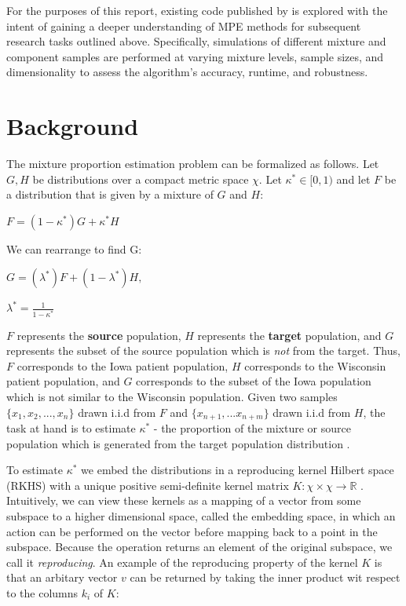 \documentclass[lineno]{biometrika}
\begin{document}
For the purposes of this report, existing code published by \citet{Ramaswamy:2016} is explored with the intent of gaining a deeper understanding of MPE methods for subsequent research tasks outlined above.  Specifically, simulations of different mixture and component samples are performed at varying mixture levels, sample sizes, and dimensionality to assess the algorithm's accuracy, runtime, and robustness.

\section{Background}
The mixture proportion estimation problem can be formalized as follows. Let $G, H$ be distributions over a compact metric space $\chi$. Let $\kappa^* \in [0,1)$ and let $F$ be a distribution that is given by a mixture of $G$ and $H$: 

\begin{center}
$F = (1-\kappa^* )G + \kappa^* H$
\end{center}

We can rearrange to find G:

\begin{center}
$G = (\lambda^*)F + (1-\lambda^*)H, $ 
\end{center}

\begin{center}
$\lambda^* = \frac{1}{1-\kappa^*}$ 
\end{center} 

$F$ represents the \textbf{source} population, $H$ represents the \textbf{target} population, and $G$ represents the subset of the source population which is \textit{not} from the target. Thus, $F$ corresponds to the Iowa patient population, $H$ corresponds to the Wisconsin patient population, and $G$ corresponds to the subset of the Iowa population which is not similar to the Wisconsin population. Given two samples $\{x_1,x_2,...,x_n\}$ drawn i.i.d from $F$ and $\{x_{n+1},...x_{n+m}\}$ drawn i.i.d from $H$, the task at hand is to estimate $\kappa^*$ - the proportion of the mixture or source population which is generated from the target population distribution \citep{Ramaswamy:2016}. \newline

To estimate $\kappa^*$ we embed the distributions in a reproducing kernel Hilbert space (RKHS) with a unique positive semi-definite kernel matrix $ K : \chi \times \chi \to \mathbb{R} $ \citep{Manton:2015}. Intuitively, we can view these kernels as a mapping of a vector from some subspace to a higher dimensional space, called the embedding space, in which an action can be performed on the vector before mapping back to a point in the subspace. Because the operation returns an element of the original subspace, we call it \textit{reproducing}. An example of the reproducing property of the kernel $K$ is that an arbitary vector $v$ can be returned by taking the inner product wit respect to the columns $k_i$ of $K$: 
\end{document}
